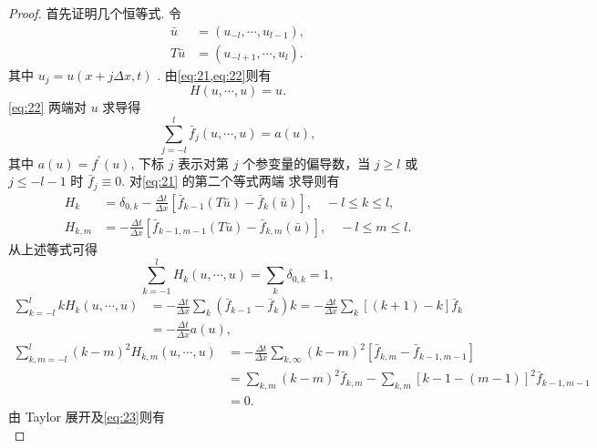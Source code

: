 \documentclass[12pt]{article}
\begin{document}
\begin{proof}
首先证明几个恒等式. 令
\begin{align}
	\bar{u}&=\left(u_{-l}, \cdots, u_{l-1}\right), \\
T \bar{u}&=\left(u_{-l+1}, \cdots, u_{l}\right).
\end{align}
其中 $u_{j}=u(x+j \Delta x, t)$ . 由\cref{eq:21,eq:22}则有
\begin{equation}
	H(u, \cdots, u)=u.
	\label{eq:23}
\end{equation}
\cref{eq:22} 两端对 ${u}$ 求导得
\begin{equation}
	\sum_{j=-l}^{l} \bar{f}_{j}(u, \cdots, u)=a(u),
\end{equation}
其中 $a(u)=f^{\prime}(u)$, 下标 $j$ 表示对第 $j$ 个参变量的偏导数，当 $j \geqslant l$ 或 $j \leqslant -l-1$ 时 $\bar{f}_{j} \equiv 0$. 对\cref{eq:21} 的第二个等式两端 求导则有
\begin{align}
H_{k}&=\delta_{0, k}-\frac{\Delta t}{\Delta x}\left[\bar{f}_{k-1}(T \bar{u})-\bar{f}_{k}(\bar{u})\right],\quad -l \leqslant k \leqslant l, \\
H_{k, m}&=-\frac{\Delta{t}}{\Delta x}\left[\bar{f}_{k-1, m-1}(T \bar{u})-\bar{f}_{k, m}(\bar{u})\right],\quad -l \leqslant m \leqslant l.
\end{align}
从上述等式可得
\begin{equation}
	\sum_{k=-1}^{l} H_{k}(u, \cdots, u)=\sum_{k} \delta_{0, k}=1,
\end{equation}
\begin{equation}
	\begin{aligned}
	\sum_{k=-l}^{l} k H_{k}(u, \cdots, u)&=-\frac{\Delta t}{\Delta x} \sum_{k}\left(\bar{f}_{k-1}-\bar{f}_{k}\right) k =-\frac{\Delta t}{\Delta x} \sum_{k}[(k+1)-k] \bar{f}_{k}\\
	&=-\frac{\Delta t}{\Delta x} a(u), 
\end{aligned}
\label{eq:24}
\end{equation}
\begin{equation}
	\begin{aligned}
		\sum_{k, m=-l}^{l}(k-m)^{2} H_{k, m}(u, \cdots, u)&=-\frac{\Delta t}{\Delta x} \sum_{k, \infty}(k-m)^{2}\left[\bar{f}_{k, m}-\bar{f}_{k-1, m-1}\right]\\
		&=\sum_{k,m}(k-m)^2\bar{f}_{k,m}-\sum_{k,m}[k-1-(m-1)]^2\bar{f}_{k-1,m-1}\\
		&=0.
	\end{aligned}
	\label{eq:25}
\end{equation}
由 Taylor 展开及\cref{eq:23}则有
\begin{equation}

\end{equation}
\end{proof}
\end{document}
